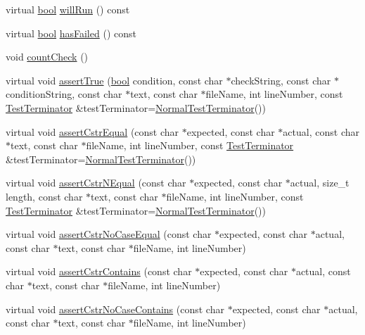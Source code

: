 \begin{DoxyCompactItemize}
\item 
virtual \hyperlink{avb__gptp_8h_af6a258d8f3ee5206d682d799316314b1}{bool} \hyperlink{class_utest_shell_afa35d9bf0fd1c772b04f48d89d318a70}{will\+Run} () const 
\item 
virtual \hyperlink{avb__gptp_8h_af6a258d8f3ee5206d682d799316314b1}{bool} \hyperlink{class_utest_shell_ae4deec08ed507f9a2f1cced854fc5a16}{has\+Failed} () const 
\item 
void \hyperlink{class_utest_shell_a58577489a2418efb4c440761e533f2e7}{count\+Check} ()
\item 
virtual void \hyperlink{class_utest_shell_ae94c3261aae58fd432f56530ed93fac0}{assert\+True} (\hyperlink{avb__gptp_8h_af6a258d8f3ee5206d682d799316314b1}{bool} condition, const char $\ast$check\+String, const char $\ast$condition\+String, const char $\ast$text, const char $\ast$file\+Name, int line\+Number, const \hyperlink{class_test_terminator}{Test\+Terminator} \&test\+Terminator=\hyperlink{class_normal_test_terminator}{Normal\+Test\+Terminator}())
\item 
virtual void \hyperlink{class_utest_shell_aabd5eeb6ba32e6101c0ec8e058a2518c}{assert\+Cstr\+Equal} (const char $\ast$expected, const char $\ast$actual, const char $\ast$text, const char $\ast$file\+Name, int line\+Number, const \hyperlink{class_test_terminator}{Test\+Terminator} \&test\+Terminator=\hyperlink{class_normal_test_terminator}{Normal\+Test\+Terminator}())
\item 
virtual void \hyperlink{class_utest_shell_a14fdfe6489e95bf228cdb05b3d41d9c3}{assert\+Cstr\+N\+Equal} (const char $\ast$expected, const char $\ast$actual, size\+\_\+t length, const char $\ast$text, const char $\ast$file\+Name, int line\+Number, const \hyperlink{class_test_terminator}{Test\+Terminator} \&test\+Terminator=\hyperlink{class_normal_test_terminator}{Normal\+Test\+Terminator}())
\item 
virtual void \hyperlink{class_utest_shell_ac9d08e315dbe87ee9286acabe85b51da}{assert\+Cstr\+No\+Case\+Equal} (const char $\ast$expected, const char $\ast$actual, const char $\ast$text, const char $\ast$file\+Name, int line\+Number)
\item 
virtual void \hyperlink{class_utest_shell_a02142e9582af1a9e622200fe46a3a15f}{assert\+Cstr\+Contains} (const char $\ast$expected, const char $\ast$actual, const char $\ast$text, const char $\ast$file\+Name, int line\+Number)
\item 
virtual void \hyperlink{class_utest_shell_afca15ab751bda33d3784efe4b06bf875}{assert\+Cstr\+No\+Case\+Contains} (const char $\ast$expected, const char $\ast$actual, const char $\ast$text, const char $\ast$file\+Name, int line\+Number)

\end{DoxyCompactItemize}
